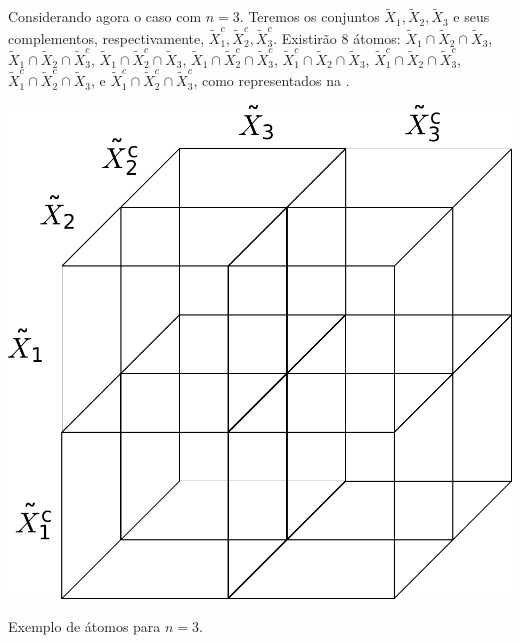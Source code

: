 \begin{example}
  Considerando agora o caso com $n=3$.
  Teremos os conjuntos $\tilde{X}_1, \tilde{X}_2, \tilde{X}_3$ e seus complementos,
  respectivamente, $\tilde{X}_1^c, \tilde{X}_2^c, \tilde{X}_3^c$. Existirão $8$ átomos:
  $\tilde{X}_1 \cap \tilde{X}_2 \cap \tilde{X}_3$,
  $\tilde{X}_1 \cap \tilde{X}_2 \cap \tilde{X}_3^c$,
  $\tilde{X}_1 \cap \tilde{X}_2^c \cap \tilde{X}_3$,
  $\tilde{X}_1 \cap \tilde{X}_2^c \cap \tilde{X}_3^c$,
  $\tilde{X}_1^c \cap \tilde{X}_2 \cap \tilde{X}_3$,
  $\tilde{X}_1^c \cap \tilde{X}_2 \cap \tilde{X}_3^c$,
  $\tilde{X}_1^c \cap \tilde{X}_2^c \cap \tilde{X}_3$, e
  $\tilde{X}_1^c \cap \tilde{X}_2^c \cap \tilde{X}_3^c$,
  como representados na .
  \begin{marginfigure}%
    \includegraphics[width=0.75\linewidth]{figures/atoms-n3.pdf}
    \caption{Exemplo de átomos para $n=3$.}
    \label{fig:atoms-n3}
  \end{marginfigure}
\end{example}

